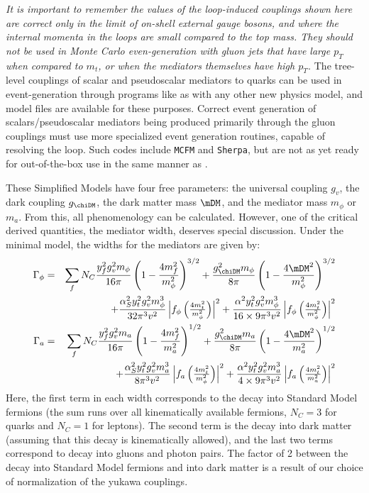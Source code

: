 {\it It is important to remember the values of the loop-induced couplings shown here are correct only in the limit of on-shell external gauge bosons, and where the internal momenta in the loops are small compared to the top mass. They should not be used in Monte Carlo even-generation with gluon jets that have large $p_T$ when compared to $m_t$, or when the mediators themselves have high $p_T$.} The tree-level couplings of scalar and pseudoscalar mediators to quarks can be used in event-generation through programs like \madgraph as with any other new physics model, and model files are available for these purposes. Correct event generation of scalars/pseudoscalar mediators being produced primarily through the gluon couplings must use more specialized event generation routines, capable of resolving the loop. Such codes include {\tt MCFM} and {\tt Sherpa}, but are not as yet ready for out-of-the-box use in the same manner as \madgraph.

These Simplified Models have four free parameters: the universal coupling $g_v$, the dark coupling $g_\chiDM$, the dark matter mass $\mDM$, and the mediator mass $m_{\phi}$ or $m_a$. From this, all phenomenology can be calculated. However, one of the critical derived quantities, the mediator width, deserves special discussion. Under the minimal model, the widths for the mediators are given by:
\begin{eqnarray}
\Gamma_\phi & = & \sum_f N_C \frac{y_f^2 g_v^2 m_\phi}{16 \pi} \left(1-\frac{4 m_f^2}{m_\phi^2}\right)^{3/2} + \frac{g_\chiDM^2 m_\phi}{8 \pi} \left(1-\frac{4 \mDM^2}{m_\phi^2}\right)^{3/2}  \label{eq:scalarwidth} \\
& & \nonumber + \frac{\alpha_S^2 y_t^2 g_v^2 m_\phi^3}{32 \pi^3 v^2} \left| f_\phi\left(\tfrac{4m_t^2}{m_\phi^2} \right)\right|^2+ \frac{\alpha^2 y_t^2 g_v^2 m_\phi^3}{16\times 9 \pi^3 v^2} \left| f_\phi\left(\tfrac{4m_t^2}{m_\phi^2} \right)\right|^2 \label{eq:pseudoscalarwidth} \\
\Gamma_a & = & \sum_f N_C \frac{y_f^2 g_v^2 m_a}{16 \pi} \left(1-\frac{4 m_f^2}{m_a^2}\right)^{1/2} + \frac{g_\chiDM^2 m_a}{8 \pi} \left(1-\frac{4 \mDM^2}{m_a^2}\right)^{1/2}  \\
& & \nonumber + \frac{\alpha_S^2 y_t^2 g_v^2 m_a^3}{8 \pi^3 v^2} \left| f_a\left(\tfrac{4m_t^2}{m_\phi^2} \right)\right|^2+ \frac{\alpha^2 y_t^2 g_v^2 m_a^3}{4\times 9 \pi^3 v^2} \left| f_a\left(\tfrac{4m_t^2}{m_a^2} \right)\right|^2 
\end{eqnarray}
Here, the first term in each width corresponds to the decay into Standard Model fermions (the sum runs over all kinematically available fermions, $N_C = 3$ for quarks and $N_C = 1$ for leptons). The second term is the decay into dark matter (assuming that this decay is kinematically allowed), and the last two terms correspond to decay into gluons and photon pairs. The factor of 2 between the decay into Standard Model fermions and into dark matter is a result of our choice of normalization of the yukawa couplings.

